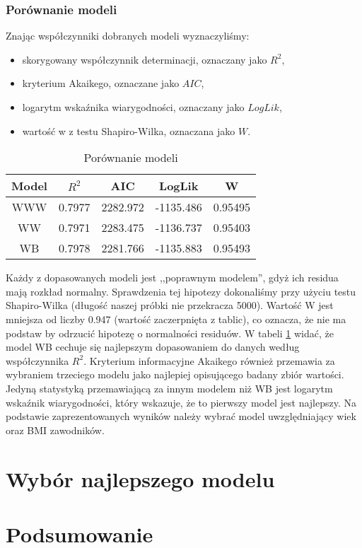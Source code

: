 \documentclass[11pt,a4paper]{article}
\begin{document}
\subsubsection{Porównanie modeli}
Znając współczynniki dobranych modeli wyznaczyliśmy:
\begin{itemize}
	\item skorygowany współczynnik determinacji, oznaczany jako $R^2$,
	\item kryterium Akaikego, oznaczane jako $AIC$,
	\item logarytm wskaźnika wiarygodności, oznaczany jako $LogLik$,
	\item wartość w z testu Shapiro-Wilka, oznaczana jako $W$.
\end{itemize}

\begin{table}[H]
	\begin{center}
		\begin{tabular}{| c | c | c | c | c |}
			\hline
			Model & $R^2$ & AIC & LogLik & W\\ \hline
			WWW & 0.7977 & 2282.972 & -1135.486 & 0.95495\\ \hline
			WW & 0.7971 & 2283.475 & -1136.737 & 0.95403\\ \hline 
			WB & 0.7978 & 2281.766 & -1135.883 & 0.95493\\ \hline  
		\end{tabular}
		\caption{Porównanie modeli}
		\label{porownanie_modeli_w}
	\end{center}
\end{table}
Każdy z dopasowanych modeli jest ,,poprawnym modelem'', gdyż ich residua mają rozkład normalny. Sprawdzenia tej hipotezy dokonaliśmy przy użyciu testu Shapiro-Wilka (długość naszej próbki nie przekracza 5000). Wartość W jest mniejsza od liczby 0.947 (wartość zaczerpnięta z tablic), co oznacza, że nie ma podstaw by odrzucić hipotezę o normalności residuów. W tabeli \ref{porownanie_modeli_w} widać, że model WB cechuje się najlepszym dopasowaniem do danych według współczynnika $R^2$. Kryterium informacyjne Akaikego również przemawia za wybraniem trzeciego modelu jako najlepiej opisującego badany zbiór wartości. Jedyną statystyką przemawiającą za innym modelem niż WB jest logarytm wskaźnik wiarygodności, który wskazuje, że to pierwszy model jest najlepszy. Na podstawie zaprezentowanych wyników należy wybrać model uwzględniający wiek oraz BMI zawodników.



\section{Wybór najlepszego modelu}

\section{Podsumowanie}
\end{document}
